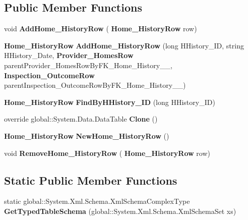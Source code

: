 \subsection*{Public Member Functions}
\begin{DoxyCompactItemize}
\item 
\mbox{\label{class_a_f_h___scheduler_1_1_home_inspection_data_set_1_1_home___history_data_table_a66196b7ca66ae87203aa0a1098d2bec4}} 
void {\bfseries Add\+Home\+\_\+\+History\+Row} (\textbf{ Home\+\_\+\+History\+Row} row)
\item 
\mbox{\label{class_a_f_h___scheduler_1_1_home_inspection_data_set_1_1_home___history_data_table_a55972d4058a43ff79b6193ca94a5ca00}} 
\textbf{ Home\+\_\+\+History\+Row} {\bfseries Add\+Home\+\_\+\+History\+Row} (long H\+History\+\_\+\+ID, string H\+History\+\_\+\+Date, \textbf{ Provider\+\_\+\+Homes\+Row} parent\+Provider\+\_\+\+Homes\+Row\+By\+F\+K\+\_\+\+Home\+\_\+\+History\+\_\+\_, \textbf{ Inspection\+\_\+\+Outcome\+Row} parent\+Inspection\+\_\+\+Outcome\+Row\+By\+F\+K\+\_\+\+Home\+\_\+\+History\+\_\+\_)
\item 
\mbox{\label{class_a_f_h___scheduler_1_1_home_inspection_data_set_1_1_home___history_data_table_aaaa472e7401bffb4e1d6e55ed49ddfe7}} 
\textbf{ Home\+\_\+\+History\+Row} {\bfseries Find\+By\+H\+History\+\_\+\+ID} (long H\+History\+\_\+\+ID)
\item 
\mbox{\label{class_a_f_h___scheduler_1_1_home_inspection_data_set_1_1_home___history_data_table_aed98eaf8f57386c7a99e11a41217641c}} 
override global\+::\+System.\+Data.\+Data\+Table {\bfseries Clone} ()
\item 
\mbox{\label{class_a_f_h___scheduler_1_1_home_inspection_data_set_1_1_home___history_data_table_a7b7bfe57d4c8658c9d7e996ab4da8078}} 
\textbf{ Home\+\_\+\+History\+Row} {\bfseries New\+Home\+\_\+\+History\+Row} ()
\item 
\mbox{\label{class_a_f_h___scheduler_1_1_home_inspection_data_set_1_1_home___history_data_table_a88a32587d86c4b83a8f2f57d1561f215}} 
void {\bfseries Remove\+Home\+\_\+\+History\+Row} (\textbf{ Home\+\_\+\+History\+Row} row)
\end{DoxyCompactItemize}
\subsection*{Static Public Member Functions}
\begin{DoxyCompactItemize}
\item 
\mbox{\label{class_a_f_h___scheduler_1_1_home_inspection_data_set_1_1_home___history_data_table_a7f15c2d0387e835afacc645e6cc8350b}} 
static global\+::\+System.\+Xml.\+Schema.\+Xml\+Schema\+Complex\+Type {\bfseries Get\+Typed\+Table\+Schema} (global\+::\+System.\+Xml.\+Schema.\+Xml\+Schema\+Set xs)
\end{DoxyCompactItemize}
